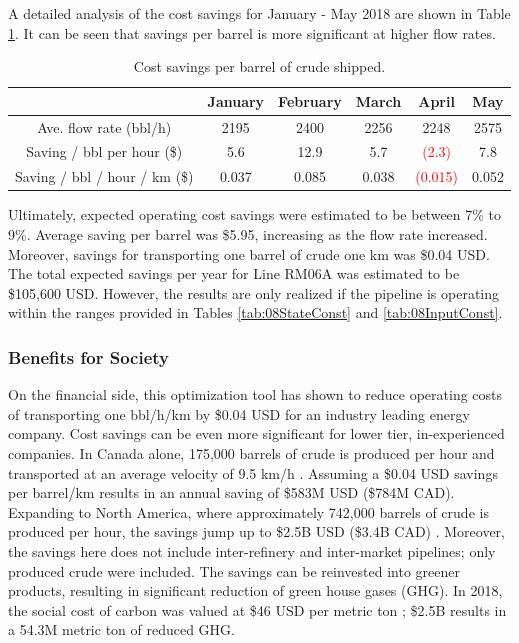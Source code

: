 A detailed analysis of the cost savings for January - May 2018 are shown in Table \ref{tab:08Cost_per_barrel}. It can be seen that savings per barrel is more significant at higher flow rates.  

\begin{table}[h]
    \centering
    {
    \begin{tabular}{c|c|c|c|c|c}
                       & January & February & March & April & May  \\ \hline
        Ave. flow rate (bbl/h) & 2195    & 2400     & 2256  & 2248  & 2575 \\
        Saving / bbl per hour (\$)      & 5.6     & 12.9     & 5.7   & \textcolor{red}{(2.3)} & 7.8\\
        Saving / bbl / hour / km (\$) & 0.037 & 0.085 & 0.038 & \textcolor{red}{(0.015)} & 0.052 \\
    \end{tabular}}
    \caption{Cost savings per barrel of crude shipped.}
    \label{tab:08Cost_per_barrel}
\end{table}

Ultimately, expected operating cost savings were estimated to be between 7\% to 9\%.  Average saving per barrel was \$5.95, increasing as the flow rate increased. Moreover, savings for transporting one barrel of crude one km was \$0.04 USD.  The total expected savings per year for Line RM06A was estimated to be \$105,600 USD.  However, the results are only realized if the pipeline is operating within the ranges provided in Tables \ref{tab:08StateConst} and \ref{tab:08InputConst}.

\subsubsection{Benefits for Society}
On the financial side, this optimization tool has shown to reduce operating costs of transporting one bbl/h/km by \$0.04 USD for an industry leading energy company. Cost savings can be even more significant for lower tier, in-experienced companies. In Canada alone, 175,000 barrels of crude is produced per hour and transported at an average velocity of 9.5 km/h \cite{canada_crude_facts}.  Assuming a \$0.04 USD savings per barrel/km results in an annual saving of \$583M USD (\$784M CAD).  Expanding to North America, where approximately 742,000 barrels of crude is produced per hour, the savings jump up to \$2.5B USD (\$3.4B CAD) \cite{NA_crude_facts}. Moreover, the savings here does not include inter-refinery and inter-market pipelines; only produced crude were included.  The savings can be reinvested into greener products, resulting in significant reduction of green house gases (GHG). In 2018, the social cost of carbon was valued at \$46 USD per metric ton \cite{cost_of_carbon}; \$2.5B results in a 54.3M metric ton of reduced GHG.

